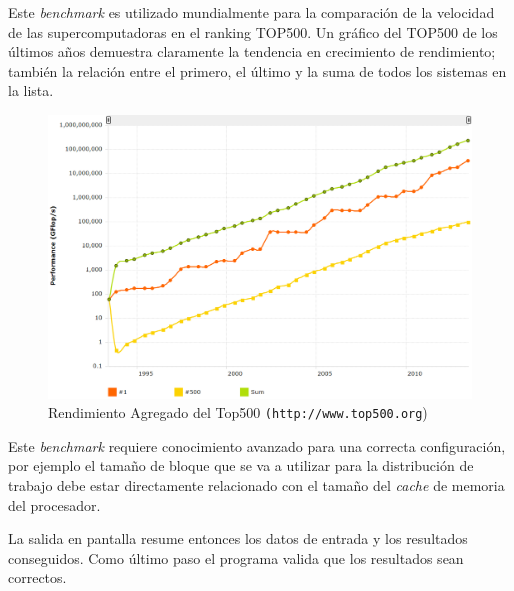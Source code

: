 \documentclass[a4paper]{report}
\begin{document}
\bigskip

Este {\it benchmark} es utilizado mundialmente para la comparación de la
velocidad de las supercomputadoras en el ranking TOP500. 
Un gráfico del TOP500 de los últimos años demuestra claramente la
tendencia en crecimiento de rendimiento; también la relación entre el primero,
el último y la suma de todos los sistemas en la lista.

\begin{figure}[H]
\centering
\includegraphics[width=12cm]{top500.png}
\caption{Rendimiento Agregado del Top500 {\tt (http://www.top500.org})}
\label{fig:top500}
\end{figure}

Este {\it benchmark} requiere conocimiento avanzado para una correcta configuración,
por ejemplo el tamaño de bloque que se va a utilizar para la distribución de trabajo
debe estar directamente relacionado con el tamaño del {\it cache} de memoria del procesador.

\bigskip

La salida en pantalla resume entonces los datos de entrada y los resultados conseguidos.
Como último paso el programa valida que los resultados sean correctos.
\end{document}
